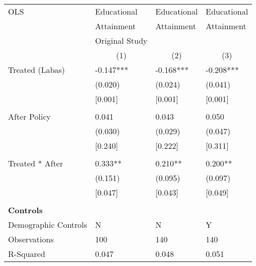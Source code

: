 \begin{tabular}{p{4cm}p{1.5cm}p{1.5cm}p{1.5cm}}
\hline\hline
OLS               &Educational & Educational &Educational \\
&Attainment &Attainment &Attainment \\
&Original Study & &  \\
&\multicolumn{1}{c}{(1)}&\multicolumn{1}{c}{(2)}&\multicolumn{1}{c}{(3)}\\
\hline
Treated (Labas)   &  -0.147***&   -0.168*** & -0.208*** \\
                &  (0.020)&  (0.024) & (0.041)\\
									& [0.001]	 &  [0.001]&  [0.001]\\
                \\
After Policy   &   0.041&   0.043 &0.050\\
                &  (0.030)&  (0.029) & (0.047)\\
								& [0.240]	 &  [0.222]&  [0.311]\\
                \\
Treated * After   &  0.333**&  0.210** & 0.200**\\
                &  (0.151)&  (0.095) &(0.097)\\
						& [0.047]	 &  [0.043]&  [0.049]\\
                \\

\multicolumn{4}{l}{\textbf{Controls}}  \\                  
Demographic Controls       &    N    &       N&        Y\\

\hline
Observations    &    100&    140 & 140\\
R-Squared    &  0.047   & 0.048 & 0.051     \\
\hline\hline
\end{tabular}